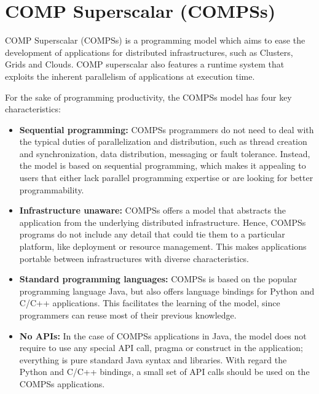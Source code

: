 \section{COMP Superscalar (COMPSs)}
\label{sec:Introduction}

COMP Superscalar (COMPSs) is a programming model which aims to ease the 
development of applications for distributed infrastructures, such as Clusters, 
Grids and Clouds. COMP superscalar also features a runtime system that exploits 
the inherent parallelism of applications at execution time.

For the sake of programming productivity, the COMPSs model has four key 
characteristics:

\begin{itemize}
 
 \item  {\bf Sequential programming:} COMPSs programmers do not need to deal 
 with the typical duties of parallelization and distribution, such as thread 
 creation and synchronization, data distribution, messaging or fault tolerance. 
 Instead, the model is based on sequential programming, which makes it appealing 
 to users that either lack parallel programming expertise or are looking for 
 better programmability.
 
 \item  {\bf Infrastructure unaware:} COMPSs offers a model that abstracts the 
 application from the underlying distributed infrastructure. Hence, COMPSs 
 programs do not include any detail that could tie them to a particular 
 platform, like deployment or resource management. This makes applications 
 portable between infrastructures with diverse characteristics.
 
 \item  {\bf Standard programming languages:} COMPSs is based on the popular 
 programming language Java, but also offers language bindings for Python and 
 C/C++ applications. This facilitates the learning of the model, since 
 programmers can reuse most of their previous knowledge.
 
 \item  {\bf No APIs:} In the case of COMPSs applications in Java, the model 
 does not require to use any special API call, pragma or construct in the 
 application; everything is pure standard Java syntax and libraries. With 
 regard the Python and C/C++ bindings, a small set of API calls should be used 
 on the COMPSs applications.

\end{itemize}


